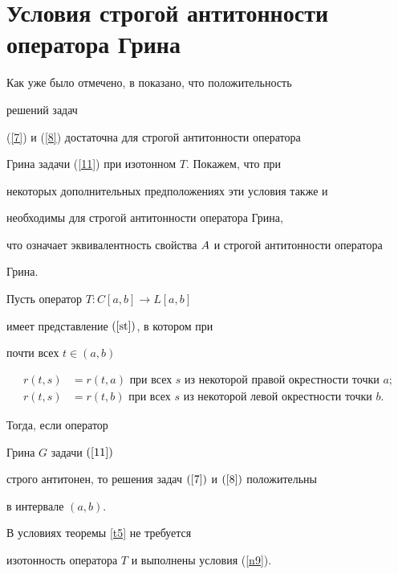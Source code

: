 \section{Условия строгой антитонности оператора Грина}





Как уже было отмечено, в \cite{AAB} показано, что положительность


решений задач


(\ref{7}) и (\ref{8}) достаточна для строгой антитонности оператора


Грина задачи (\ref{11}) при изотонном $T$. Покажем, что при


некоторых дополнительных предположениях эти условия также и


необходимы для строгой антитонности оператора Грина,


что означает эквивалентность свойства $A$ и строгой антитонности оператора


Грина.





\begin{thms}\label{t5}


Пусть оператор $T:C[a,b]\to L[a,b]$


имеет представление $(\ref{st})$, в котором при


почти всех $t\in(a,b)$


\begin{align*}


r(t,s)&=r(t,a)\text{ при всех $s$ из некоторой


правой окрестности точки $a;$}\\


%


r(t,s)&=r(t,b)\text{ при всех $s$ из некоторой


левой окрестности точки $b$}.


\end{align*}


Тогда, если оператор


Грина $G$ задачи $(\ref{11})$


строго антитонен, то решения задач $(\ref{7})$ и $(\ref{8})$ положительны


в интервале $(a,b)$.


\end{thms}





\begin{notes}


В условиях теоремы \ref{t5} не требуется


изотонность оператора $T$ и выполнены условия (\ref{n9}).


\end{notes}





